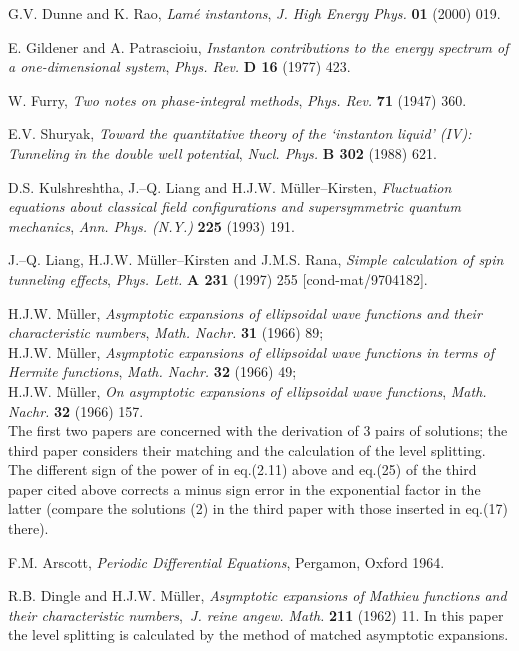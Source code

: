 \documentclass[a4paper,12pt,a4]{article}
\begin{document}
\begin{thebibliography}{99}

  G.V. Dunne and K. Rao, {\it Lam\'{e} instantons}, {\it J. High
Energy Phys.} {\bf 01} (2000) 019.

  E. Gildener and A. Patrascioiu, {\it Instanton contributions to
the energy spectrum of a one-dimensional system}, {\it Phys. Rev.} {\bf D 16}
(1977) 423.

  W. Furry, {\it Two notes on phase-integral methods}, {\it Phys.
Rev.} {\bf 71} (1947) 360.

  E.V. Shuryak, {\it Toward the quantitative theory of the
`instanton liquid' (IV): Tunneling in the double well potential}, {\it Nucl.
Phys.} {\bf B 302} (1988) 621.

  D.S. Kulshreshtha, J.--Q. Liang and H.J.W. M\"{u}ller--Kirsten, 
{\it Fluctuation equations about classical field configurations and
supersymmetric quantum mechanics}, {\it Ann. Phys. (N.Y.)} {\bf 225} (1993)
191.

  J.--Q. Liang, H.J.W. M\"{u}ller--Kirsten and J.M.S. Rana, {\it %
Simple calculation of spin tunneling effects}, {\it Phys. Lett.} {\bf A 231}
(1997) 255 [cond-mat/9704182].

  H.J.W. M\"{u}ller, {\it Asymptotic expansions of ellipsoidal
wave functions and their characteristic numbers}, {\it Math. Nachr.} {\bf 31}
(1966) 89; \\H.J.W. M\"{u}ller, {\it Asymptotic expansions of ellipsoidal wave
functions in terms of Hermite functions}, {\it Math. Nachr.}  {\bf 32} (1966)
49; \\H.J.W. M\"{u}ller, {\it On asymptotic expansions of ellipsoidal wave
functions}, {\it Math. Nachr.} {\bf 32} (1966) 157.\\ The first two papers are
concerned with the derivation of 3 pairs of solutions; the third paper
considers their matching and the calculation of the level splitting. The
different sign of the power of \coordHE{} in eq.(2.11) above and eq.(25)
of the third paper cited above corrects a minus sign error in the
exponential factor in the latter (compare the solutions (2) in the third
paper with those inserted in eq.(17) there).

  F.M. Arscott, {\it Periodic Differential Equations}, Pergamon,
Oxford 1964.

  R.B. Dingle and H.J.W. M\"{u}ller, {\it Asymptotic expansions
of Mathieu functions and their characteristic numbers},{\it \ J. reine
angew. Math.} {\bf 211} (1962) 11. In this paper the level splitting is
calculated by the method of matched asymptotic expansions.


\end{thebibliography}
\end{document}
